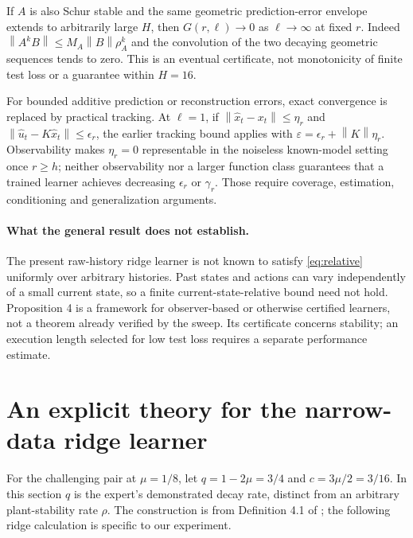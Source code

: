 \documentclass[11pt]{article}
\newcommand{\norm}[1]{\left\lVert#1\right\rVert}
\begin{document}
If $A$ is also Schur stable and the same geometric prediction-error envelope extends to arbitrarily large $H$, then $G(r,\ell)\to0$ as $\ell\to\infty$ at fixed $r$. Indeed $\norm{A^kB}\le M_A\norm{B}\rho_A^k$ and the convolution of the two decaying geometric sequences tends to zero. This is an eventual certificate, not monotonicity of finite test loss or a guarantee within $H=16$.

For bounded additive prediction or reconstruction errors, exact convergence is replaced by practical tracking. At $\ell=1$, if $\norm{\hat x_t-x_t}\le\eta_r$ and $\norm{\hat u_t-K\hat x_t}\le\epsilon_r$, the earlier tracking bound applies with $\varepsilon=\epsilon_r+\norm{K}\eta_r$. Observability makes $\eta_r=0$ representable in the noiseless known-model setting once $r\ge h$; neither observability nor a larger function class guarantees that a trained learner achieves decreasing $\epsilon_r$ or $\gamma_r$. Those require coverage, estimation, conditioning and generalization arguments.

\paragraph{What the general result does not establish.}
The present raw-history ridge learner is not known to satisfy \eqref{eq:relative} uniformly over arbitrary histories. Past states and actions can vary independently of a small current state, so a finite current-state-relative bound need not hold. Proposition 4 is a framework for observer-based or otherwise certified learners, not a theorem already verified by the sweep. Its certificate concerns stability; an execution length selected for low test loss requires a separate performance estimate.

\section{An explicit theory for the narrow-data ridge learner}
For the challenging pair at $\mu=1/8$, let $q=1-2\mu=3/4$ and $c=3\mu/2=3/16$. In this section $q$ is the expert's demonstrated decay rate, distinct from an arbitrary plant-stability rate $\rho$. The construction is from Definition 4.1 of \citet{simchowitz2025}; the following ridge calculation is specific to our experiment.
\end{document}
